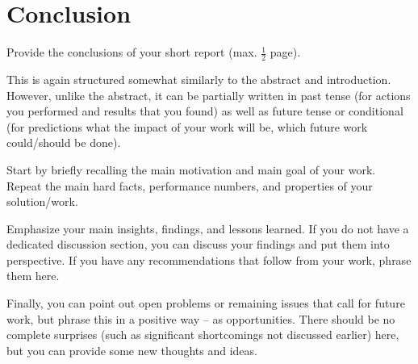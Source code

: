 \documentclass[11pt,titlepage=false]{scrreprt}
\begin{document}

\chapter{Conclusion}
\label{chap:conclusion}

Provide the conclusions of your short report (max. $\frac{1}{2}$ page).

This is again structured somewhat similarly to the abstract and introduction.
However, unlike the abstract, it can be partially written in past tense (for actions you performed and results that you found) as well as future tense or conditional (for predictions what the impact of your work will be, which future work could/should be done).

Start by briefly recalling the main motivation and main goal of your work.
Repeat the main hard facts, performance numbers, and properties of your solution/work.

Emphasize your main insights, findings, and lessons learned.
If you do not have a dedicated discussion section, you can discuss your findings and put them into perspective.
If you have any recommendations that follow from your work, phrase them here.

Finally, you can point out open problems or remaining issues that call for future work, but phrase this in a positive way -- as opportunities.
There should be no complete surprises (such as significant shortcomings not discussed earlier) here, but you can provide some new thoughts and ideas.



\printbibliography
\end{document}
